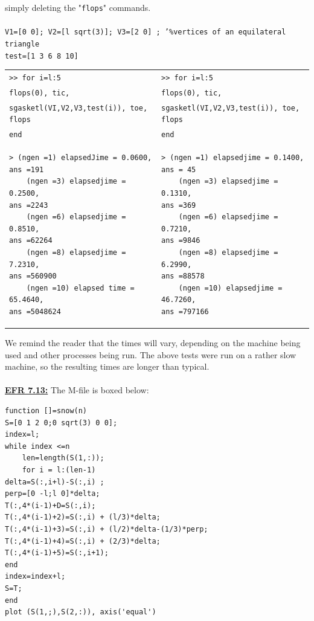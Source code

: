 \documentclass[../main.tex]{subfiles}
\begin{document}
simply deleting the "\texttt{flops}" commands. 
\\
\\
\texttt{V1=[0 0]; V2=[l sqrt(3)]; V3=[2 0] ; '\%vertices of an equilateral 
triangle }\\
\texttt{test=[1 3 6 8 10]}
\begin{center}
\begin{tabular}{|l|l|}
\hline
\texttt{>> for i=l:5 }&\texttt{>> for i=l:5 }\\
\texttt{flops(0), tic, }&\texttt{flops(0), tic, }\\
\hline
\texttt{sgasketl(VI,V2,V3,test(i)), toe, 
flops 
}&\texttt{sgasketl(VI,V2,V3,test(i)), toe, 
flops 
}\\
\texttt{end}&\texttt{end}\\
\begin{lstlisting}[numbers=none,frame=none]
> (ngen =1) elapsedJime = 0.0600, 
ans =191 
	(ngen =3) elapsedjime = 0.2500, 
ans =2243 
	(ngen =6) elapsedjime = 0.8510, 
ans =62264 
	(ngen =8) elapsedjime = 7.2310, 
ans =560900 
	(ngen =10) elapsed time = 65.4640, 
ans =5048624 
\end{lstlisting}&\begin{lstlisting}[numbers=none,frame=none]
> (ngen =1) elapsedjime = 0.1400, 
ans = 45 
	(ngen =3) elapsedjime = 0.1310, 
ans =369 
	(ngen =6) elapsedjime = 0.7210, 
ans =9846 
	(ngen =8) elapsedjime = 6.2990, 
ans =88578 
	(ngen =10) elapsedjime = 46.7260, 
ans =797166 
\end{lstlisting}\\
\hline
\end{tabular}
\end{center}
We remind the reader that the times will vary, depending on the machine being used and other 
processes being run. The above tests were run on a rather slow machine, so the resulting times are 
longer than typical.
\\
\\
\textbf{\underline{EFR 7.13:}} The M-file is boxed below: 
\begin{lstlisting}[numbers=none]
function []=snow(n) 
S=[0 1 2 0;0 sqrt(3) 0 0]; 
index=l; 
while index <=n 
	len=length(S(1,:)); 
	for i = l:(len-1) 
delta=S(:,i+l)-S(:,i) ; 
perp=[0 -l;l 0]*delta; 
T(:,4*(i-1)+D=S(:,i); 
T(:,4*(i-1)+2)=S(:,i) + (l/3)*delta; 
T(:,4*(i-1)+3)=S(:,i) + (l/2)*delta-(1/3)*perp; 
T(:,4*(i-1)+4)=S(:,i) + (2/3)*delta; 
T(:,4*(i-1)+5)=S(:,i+1); 
end 
index=index+l; 
S=T; 
end 
plot (S(1,;),S(2,:)), axis('equal')
\end{lstlisting}
\end{document}
